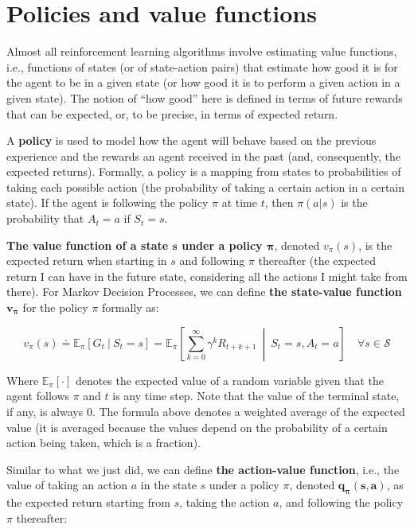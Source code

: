 \section{Policies and value functions}
Almost all reinforcement learning algorithms involve estimating value functions, i.e., functions of states (or of state-action pairs) that estimate how good it is for the agent to be in a given state (or how good it is to perform a given action in a given state). The notion of ``how good'' here is defined in terms of future rewards that can be expected, or, to be precise, in terms of expected return.

A \textbf{policy} is used to model how the agent will behave based on the previous experience and the rewards an agent received in the past (and, consequently, the expected returns). Formally, a policy is a mapping from states to probabilities of taking each possible action (the probability of taking a certain action in a certain state). If the agent is following the policy $\pi$ at time $t$, then $\pi (a \vert s)$ is the probability that $A_t=a$ if $S_t=s$.

\textbf{The value function of a state $\boldsymbol{s}$ under a policy $\boldsymbol{\pi}$}, denoted $v_\pi (s)$, is the expected return when starting in $s$ and following $\pi$ thereafter (the expected return I can have in the future state, considering all the actions I might take from there). For Markov Decision Processes, we can define \textbf{the state-value function} $\boldsymbol{v_\pi}$ for the policy $\pi$ formally as:

\begin{equation}
    v_\pi(s) \doteq \mathbb{E}_\pi \left[ G_t  \ \vert \  S_t = s \right] = \mathbb{E}_\pi \left[ \sum_{k=0}^{\infty}  \gamma^k R_{t+k+1} \  \middle\vert \  S_t = s, A_t = a \right] \quad \forall s \in \mathcal{S}
    \label{eq:ch2-statevaluefunction}
\end{equation}

Where $\mathbb{E}_\pi [\cdot]$ denotes the expected value of a random variable given that the agent follows $\pi$ and $t$ is any time step. Note that the value of the terminal state, if any, is always $0$. The formula above denotes a weighted average of the expected value (it is averaged because the values depend on the probability of a certain action being taken, which is a fraction).

Similar to what we just did, we can define \textbf{the action-value function}, i.e., the value of taking an action $a$ in the state $s$ under a policy $\pi$, denoted $\boldsymbol{q_\pi (s,a)}$, as the expected return starting from $s$, taking the action $a$, and following the policy $\pi$ thereafter:

